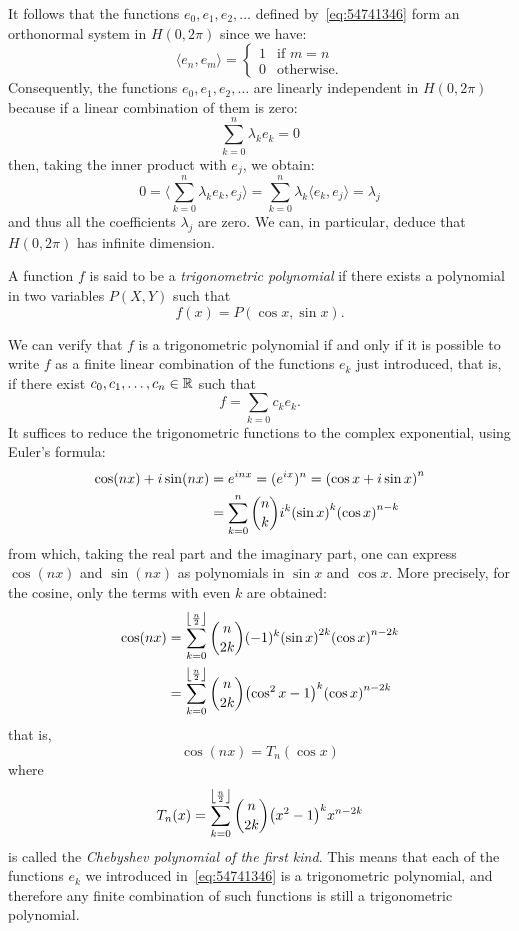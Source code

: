 It follows that the functions $e_0,e_1,e_2,\dots$ defined by~\eqref{eq:54741346}
form an orthonormal system in $H(0,2\pi)$ since we have:
\[
  \langle e_n, e_m \rangle =
  \begin{cases} 1 &\text{if $m=n$}\\
  0 & \text{otherwise}.
  \end{cases}
\]
Consequently, the functions $e_0,e_1,e_2, \dots$ are linearly independent in
$H(0,2\pi)$ because if a linear combination of them is zero:
\[
  \sum_{k=0}^n \lambda_k e_k = 0
\]
then, taking the inner product with $e_j$, we obtain:
\[
  0 = \langle \sum_{k=0}^n \lambda_k e_k , e_j\rangle
  = \sum_{k=0}^n \lambda_k \langle e_k, e_j\rangle
  = \lambda_j
\]
and thus all the coefficients $\lambda_j$ are zero. We can, in particular,
deduce that $H(0,2\pi)$ has infinite dimension.

\begin{definition}
A function $f$ is said to be a \emph{trigonometric polynomial}%
 if there exists a polynomial in two variables $P(X,Y)$ such that
\[
  f(x) = P(\cos x, \sin x).
\]
\end{definition}

We can verify that $f$ is a trigonometric polynomial if and only if it is
possible to write $f$ as a finite linear combination of the functions $e_k$ just
introduced, that is, if there exist $c_0, c_1, \dots, c_n\in {\mathbb R}$ such that
\[
  f = \sum_{k=0} c_k e_k.
\]
It suffices to reduce the trigonometric functions to the complex exponential,
using Euler's formula:
\begin{align*}
   \cos(nx) + i \sin(nx)
   &= e^{inx} = (e^{ix})^n
   = {\left( \cos x + i \sin x \right)}^n\\
   &= \sum_{k=0}^n {n \choose k} i^k {\left( \sin x \right)}^k {\left( \cos x \right)}^{n-k}
\end{align*}
from which, taking the real part and the imaginary part, one can express
$\cos(nx)$ and $\sin(nx)$ as polynomials in $\sin x$ and $\cos x$. More
precisely, for the cosine, only the terms with even $k$ are obtained:
\begin{align*}
\cos(nx) &= \sum_{k=0}^{\left\lfloor \frac n 2 \right\rfloor} {n \choose 2k} (-1)^k {\left( \sin x \right)}^{2k} {\left( \cos x \right)}^{n-2k}\\
&= \sum_{k=0}^{\left\lfloor \frac n 2 \right\rfloor}{n \choose 2k} {\left( \cos^2 x -1 \right)}^k
{\left( \cos x \right)}^{n-2k}
\end{align*}
that is,
\[
  \cos(nx) = T_n(\cos x)
\]
where
\[
    T_n(x) = \sum_{k=0}^{\left\lfloor \frac n 2 \right\rfloor}{n \choose 2k} {\left( x^2 -1 \right)}^k
  x^{n-2k}
\]
is called the \emph{Chebyshev polynomial of the first kind}.
%
%
This means that each of the functions $e_k$ we introduced in~\eqref{eq:54741346}
is a trigonometric polynomial, and therefore any finite combination of such
functions is still a trigonometric polynomial.

